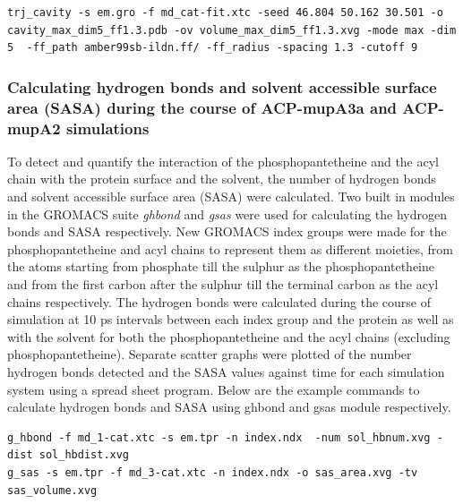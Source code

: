 \begin{lstlisting}
trj_cavity -s em.gro -f md_cat-fit.xtc -seed 46.804 50.162 30.501 -o cavity_max_dim5_ff1.3.pdb -ov volume_max_dim5_ff1.3.xvg -mode max -dim 5  -ff_path amber99sb-ildn.ff/ -ff_radius -spacing 1.3 -cutoff 9
\end{lstlisting}
			
			
			\subsubsection{Calculating hydrogen bonds and solvent accessible surface area (SASA) during the course of ACP-mupA3a and ACP-mupA2 simulations}
			\label{sec:hbond_SASA}
			To detect and quantify the interaction of the phosphopantetheine and the acyl chain with the protein surface and the solvent, the number of hydrogen bonds and solvent accessible surface area (SASA) were calculated. Two built in modules in the GROMACS suite \textit{g\textunderscore hbond} and \textit{g\textunderscore sas} were used for calculating the hydrogen bonds and SASA respectively. New GROMACS index groups were made for the phosphopantetheine and acyl chains to represent them as different moieties, from the atoms starting from phosphate till the sulphur as the phosphopantetheine and from the first carbon after the sulphur till the terminal carbon as the acyl chains respectively. The hydrogen bonds were calculated during the course of simulation at 10 ps intervals between each index group and the protein as well as with the solvent for both the phosphopantetheine and the acyl chains (excluding phosphopantetheine). Separate scatter graphs were plotted of the number hydrogen bonds detected and the SASA values against time for each simulation system using a spread sheet program. Below are the example commands to calculate hydrogen bonds and SASA using g\textunderscore hbond and g\textunderscore sas module respectively.
			
\begin{lstlisting}
g_hbond -f md_1-cat.xtc -s em.tpr -n index.ndx  -num sol_hbnum.xvg -dist sol_hbdist.xvg
g_sas -s em.tpr -f md_3-cat.xtc -n index.ndx -o sas_area.xvg -tv sas_volume.xvg
\end{lstlisting}
			
			
